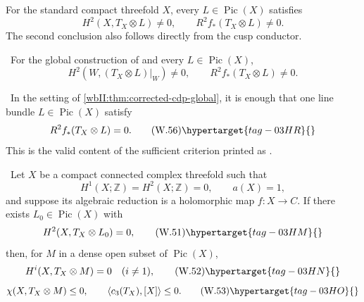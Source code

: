 
\begin{corollary}
\hypertarget{tag-03IV}{}\label{wbII:test:cdp-comparison}


For the standard compact threefold $X$, every $L\in\operatorname{Pic}(X)$
satisfies
\[
 H^2(X,T_X\otimes L)\ne0,
 \qquad R^2f_*(T_X\otimes L)\ne0.
\]
The second conclusion also follows directly from the cusp conductor.
\end{corollary}

\begin{corollary}
\hypertarget{tag-03DR}{}\label{wbII:cor:candidate-conductor-actual}


\ For the global construction of
 and every
$L\in\operatorname{Pic}(X)$,
\[
H^2(W,(T_X\otimes L)|_W)\ne0,
\qquad R^2f_*(T_X\otimes L)\ne0.
\]
\end{corollary}

\begin{corollary}\hypertarget{tag-03DT}{}\label{wbII:cor:corrected-cdp-relative}

\label{wbII:cor:relative}
\ In the setting of
\cref{wbII:thm:corrected-cdp-global}, it is enough that one line bundle
\(L\in\operatorname{Pic}(X)\) satisfy
\[
 R^2f_*(T_X\otimes L)=0.
\tag{W.56}\hypertarget{tag-03HR}{}\label{wbII:eq:W:5.29}
\]
This is the valid content of the sufficient criterion printed as
\cite[Proposition~2.4, p.~680]{CDP20}.
\end{corollary}

\begin{theorem}
\hypertarget{tag-03J0}{}\label{wbII:thm:corrected-cdp-global}

\label{wbII:thm:corrected-global}
\ Let \(X\) be a compact connected complex threefold such that
\[
 H^1(X;\mathbb Z)=H^2(X;\mathbb Z)=0,\qquad a(X)=1,
\]
and suppose its algebraic reduction is a holomorphic map
\(f:X\to C\).  If there exists \(L_0\in\operatorname{Pic}(X)\) with
\[
 H^2(X,T_X\otimes L_0)=0,
\tag{W.51}\hypertarget{tag-03HM}{}\label{wbII:eq:W:5.24}
\]
then, for \(M\) in a dense open subset of \(\operatorname{Pic}(X)\),
\[
 H^i(X,T_X\otimes M)=0\quad(i\ne1),
\tag{W.52}\hypertarget{tag-03HN}{}\label{wbII:eq:W:5.25}
\]
\[
 \chi(X,T_X\otimes M)\le0,\qquad
 \left\langle c_3(T_X),[X]\right\rangle\le0.
\tag{W.53}\hypertarget{tag-03HO}{}\label{wbII:eq:W:5.26}
\]
\end{theorem}

